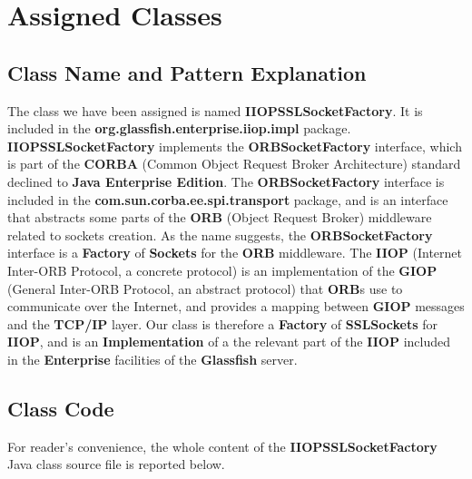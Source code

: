 \section{Assigned Classes}

\subsection{Class Name and Pattern Explanation}
The class we have been assigned is named \textbf{IIOPSSLSocketFactory}.
It is included in the \textbf{org.glassfish.enterprise.iiop.impl} package.
\textbf{IIOPSSLSocketFactory} implements the \textbf{ORBSocketFactory} interface, which is part of the \textbf{CORBA} (Common Object Request Broker Architecture) standard declined to \textbf{Java Enterprise Edition}.
The \textbf{ORBSocketFactory} interface is included in the \textbf{com.sun.corba.ee.spi.transport} package, and is an interface that abstracts some parts of the \textbf{ORB} (Object Request Broker) middleware related to sockets creation.
As the name suggests, the \textbf{ORBSocketFactory} interface is a \textbf{Factory} of \textbf{Sockets} for the \textbf{ORB} middleware.
The \textbf{IIOP} (Internet Inter-ORB Protocol, a concrete protocol) is an implementation of the \textbf{GIOP} (General Inter-ORB Protocol, an abstract protocol) that \textbf{ORB}s use to communicate over the Internet, and provides a mapping between \textbf{GIOP} messages and the \textbf{TCP/IP} layer.
Our class is therefore a \textbf{Factory} of \textbf{SSLSockets} for \textbf{IIOP}, and is an \textbf{Implementation} of a the relevant part of the \textbf{IIOP} included in the \textbf{Enterprise} facilities of the \textbf{Glassfish} server.

\subsection{Class Code}
For reader's convenience, the whole content of the \textbf{IIOPSSLSocketFactory} Java class source file is reported below.

